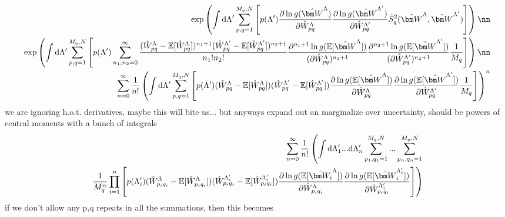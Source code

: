 \begin{align}
\exp\left(\int {\rm d}\Lambda' \sum_{p,q=1}^{M_q,N}\left[p(\Lambda') \frac{\partial \ln g(\hat{\bm W}^\Lambda)}{\partial \hat{W}^\Lambda_{pq}}  \frac{\partial \ln g(\hat{\bm W}^{\Lambda'})}{\partial \hat{W}^{\Lambda'}_{pq}}\hat{S}^2_q(\hat{\bm W}^\Lambda, \hat{\bm W}^{\Lambda'})\right]\right) \nn \\
\exp\left(\int {\rm d}\Lambda' \sum_{p,q=1}^{M_q,N}\left[p(\Lambda') \sum_{n_1,n_2=0}^\infty \frac{(\hat{W}_{pq}^{\Lambda}-\mathbb{E}[\hat{W}_{pq}^{\Lambda}])^{n_1+1}(\hat{W}_{pq}^{\Lambda'}-\mathbb{E}[\hat{W}_{pq}^{\Lambda'}])^{n_2+1}}{n_1!n_2!}\frac{\partial^{n_1+1} \ln g(\mathbb{E}[\hat{\bm W}^{\Lambda}])}{(\partial \hat{W}^\Lambda_{pq})^{n_1+1}}\frac{\partial^{n_2+1} \ln g(\mathbb{E}[\hat{\bm W}^{\Lambda'}])}{(\partial \hat{W}^{\Lambda'}_{pq})^{n_2+1}}\frac{1}{M_q}\right]\right) \nn \\ 
\sum_{n=0}^\infty \frac{1}{n!}\left(\int {\rm d}\Lambda' \sum_{p,q=1}^{M_q,N}\left[p(\Lambda') (\hat{W}_{pq}^{\Lambda}-\mathbb{E}[\hat{W}_{pq}^{\Lambda}])(\hat{W}_{pq}^{\Lambda'}-\mathbb{E}[\hat{W}_{pq}^{\Lambda'}])\frac{\partial \ln g(\mathbb{E}[\hat{\bm W}^{\Lambda}])}{\partial \hat{W}^\Lambda_{pq}}\frac{\partial \ln g(\mathbb{E}[\hat{\bm W}^{\Lambda'}])}{\partial \hat{W}^{\Lambda'}_{pq}}\frac{1}{M_q}\right]\right)^n
\end{align}
we are ignoring h.o.t. derivatives, maybe this will bite us... but anyways
expand out an marginalize over uncertainty, should be powers of central moments with a bunch of integrals
\begin{align}
\sum_{n=0}^\infty \frac{1}{n!}\left(\int {\rm d}\Lambda_1'...{\rm d}\Lambda_n' \sum_{p_1,q_1=1}^{M_q,N}...\sum_{p_n,q_n=1}^{M_q,N} \right. \\ \left. \frac{1}{M_q^n}\prod_{i=1}^n \left[p(\Lambda'_i) (\hat{W}_{p_iq_i}^{\Lambda}-\mathbb{E}[\hat{W}_{p_iq_i}^{\Lambda}])(\hat{W}_{p_iq_i}^{\Lambda'_i}-\mathbb{E}[\hat{W}_{p_iq_i}^{\Lambda'_i}])\frac{\partial \ln g(\mathbb{E}[\hat{\bm W_i}^{\Lambda}])}{\partial \hat{W}^\Lambda_{p_iq_i}}\frac{\partial \ln g(\mathbb{E}[\hat{\bm W}_i^{\Lambda'_i}])}{\partial \hat{W}^{\Lambda'_i}_{p_iq_i}}\right]\right)
\end{align}
if we don't allow any p,q repeats in all the summations, then this becomes
